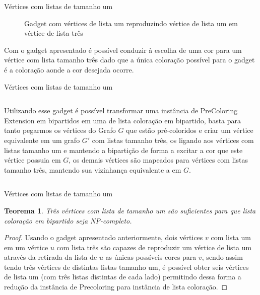 \documentclass[9pt, compress]{beamer}
\newtheorem{teorema}{Teorema}
\newcommand{\?}{\textcolor{warn}{\textit{?}}}
\begin{document}
    \begin{frame}{Vértices com listas de tamanho um}
   \begin{figure}[H]
      \begin{subfigure}
        \centering
		    
      \end{subfigure}
      \begin{subfigure}
        \centering
		    
      \end{subfigure}
      \begin{subfigure}
        \centering
		    
      \end{subfigure}
      \caption{Gadget com vértices de lista um reproduzindo vértice de lista um em vértice de lista três}
      \label{fig:gadget}
  \end{figure}

      Com o gadget apresentado é possível conduzir à escolha de uma cor para um vértice com lista tamanho três dado que a única coloração possível para o gadget é a coloração aonde a cor desejada ocorre.
    \end{frame}
    \begin{frame}{Vértices com listas de tamanho um}
    \begin{columns}
      Utilizando esse gadget é possível transformar uma instância de PreColoring Extension em bipartidos em uma de lista coloração em bipartido, basta para tanto pegarmos os vértices do Grafo $G$ que estão pré-coloridos e criar um vértice equivalente em um grafo $G'$ com listas tamanho três, os ligando aos vértices com listas tamanho um e mantendo a bipartição de forma a excitar a cor que este vértice possuia em $G$, os demais vértices são mapeados para vértices com listas tamanho três, mantendo sua vizinhança equivalente a em $G$.
    \end{columns}
      
    \end{frame}
     \begin{frame}{Vértices com listas de tamanho um}
       \begin{teorema}
         Três vértices com lista de tamanho um são suficientes para que lista coloração em bipartido seja NP-completo.
       \end{teorema}
       \begin{proof}
        Usando o gadget apresentado anteriormente, dois vértices $v$ com lista um em um vértice $u$ com lista três são capazes de reproduzir um vértice de lista um através da retirada da lista de $u$ as únicas possíveis cores para $v$, sendo assim tendo três vértices de distintas listas tamanho um, é possível obter seis vértices de lista um (com três listas distintas de cada lado) permitindo dessa forma a redução da instância de Precoloring para instância de lista coloração.
       \end{proof}
     \end{frame}
\end{document}
